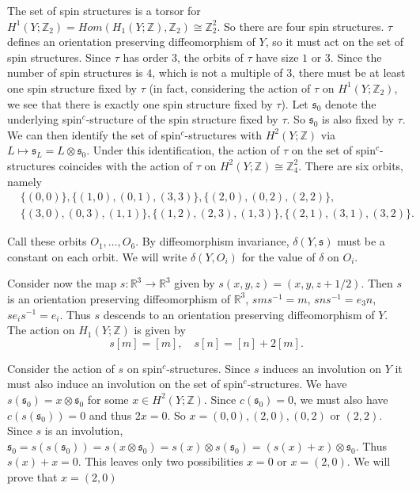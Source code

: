 \documentclass{amsart}
\theoremstyle{definition}
\theoremstyle{remark}
\numberwithin{equation}{section}
\begin{document}
The set of spin structures is a torsor for $H^1(Y ; \mathbb{Z}_2) = Hom( H_1(Y ; \mathbb{Z}) , \mathbb{Z}_2) \cong \mathbb{Z}_2^2$. So there are four spin structures. $\tau$ defines an orientation preserving diffeomorphism of $Y$, so it must act on the set of spin structures. Since $\tau$ has order $3$, the orbits of $\tau$ have size $1$ or $3$. Since the number of spin structures is $4$, which is not a multiple of $3$, there must be at least one spin structure fixed by $\tau$ (in fact, considering the action of $\tau$ on $H^1(Y ; \mathbb{Z}_2)$, we see that there is exactly one spin structure fixed by $\tau$). Let $\mathfrak{s}_0$ denote the underlying spin$^c$-structure of the spin structure fixed by $\tau$. So $\mathfrak{s}_0$ is also fixed by $\tau$. We can then identify the set of spin$^c$-structures with $H^2(Y ; \mathbb{Z})$ via $L \mapsto \mathfrak{s}_L = L \otimes \mathfrak{s}_0$. Under this identification, the action of $\tau$ on the set of spin$^c$-structures coincides with the action of $\tau$ on $H^2(Y ; \mathbb{Z}) \cong \mathbb{Z}_4^2$. There are six orbits, namely
\begin{align*}
& \{ (0,0) \}, \{ (1,0),(0,1),(3,3) \} , \{ (2,0) , (0,2) , (2,2) \}, \\
& \{ (3,0) , (0,3) , (1,1) \} , \{ (1,2) , (2,3) , (1,3) \} , \{ (2,1) ,  (3,1) , (3,2) \}.
\end{align*}

Call these orbits $O_1, \dots , O_6$. By diffeomorphism invariance, $\delta(Y , \mathfrak{s})$ must be a constant on each orbit. We will write $\delta(Y , O_i)$ for the value of $\delta$ on $O_i$.

Consider now the map $s\colon  \mathbb{R}^3 \to \mathbb{R}^3$ given by $s(x,y,z) = (x,y,z+1/2)$. Then $s$ is an orientation preserving diffeomorphism of $\mathbb{R}^3$, $s m s^{-1} = m$, $s n s^{-1} = e_3 n$, $se_is^{-1} = e_i$. Thus $s$ descends to an orientation preserving diffeomorphism of $Y$. The action on $H_1(Y ; \mathbb{Z})$ is given by
\[
s[m] = [m], \quad s[n] = [n] + 2[m].
\]

Consider the action of $s$ on spin$^c$-structures. Since $s$ induces an involution on $Y$ it must also induce an involution on the set of spin$^c$-structures. We have $s(\mathfrak{s}_0) = x \otimes \mathfrak{s}_0$ for some $x \in H^2(Y ; \mathbb{Z})$. Since $c(\mathfrak{s}_0) = 0$, we must also have $c( s(\mathfrak{s}_0) ) = 0$ and thus $2x = 0$. So $x = (0,0), (2,0) , (0,2)$ or $(2,2)$. Since $s$ is an involution, $\mathfrak{s}_0 = s ( s(\mathfrak{s}_0) ) = s( x \otimes \mathfrak{s}_0) = s(x) \otimes s(\mathfrak{s}_0) = (s(x) + x) \otimes \mathfrak{s}_0$. Thus $s(x)  + x = 0$. This leaves only two possibilities $x = 0$ or $x = (2,0)$. We will prove that $x = (2,0)$
\end{document}
